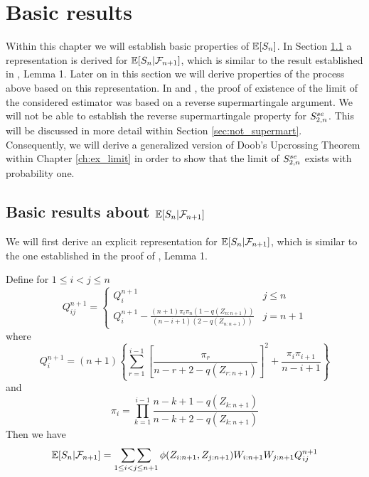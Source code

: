 \chapter{Basic results}

Within this chapter we will establish basic properties of $\mathbb{E}[S_n]$. In Section \ref{sec:representation} a representation is derived for $\mathbb{E}[S_n|\mathcal{F}_{n+1}]$, which is similar to the result established in \cite{bose1999strong}, Lemma 1. Later on in this section we will derive properties of the process above based on this representation. In \cite{bose1999strong} and \cite{dikta1998semiparametric}, the proof of existence of the limit of the considered estimator was based on a reverse supermartingale argument. We will not be able to establish the reverse supermartingale property for $S_{2,n}^{se}$. This will be discussed in more detail within Section \ref{sec:not_supermart}. Consequently, we will derive a generalized version of Doob's Upcrossing Theorem within Chapter \ref{ch:ex_limit} in order to show that the limit of $S_{2,n}^{se}$ exists with probability one.
%
%
%
\section{Basic results about $\mathbb{E}[S_{n}|\mathcal{F}_{n+1}]$} \label{sec:representation}
%
We will first derive an explicit representation for $\mathbb{E}[S_{n}|\mathcal{F}_{n+1}]$, which is similar to the one established in the proof of \cite{bose1999strong}, Lemma 1.
\begin{lemma} \label{lem:qi}
Define for $1\leq i<j\leq n$
\[Q_{ij}^{n+1} = \begin{cases} 
      Q_i^{n+1} & j\leq n \\
      Q_i^{n+1} - \frac{(n+1)\pi_i \pi_n (1-q(Z_{n:n+1}))}{(n-i+1)(2-q(Z_{n:n+1}))} & j=n+1
   \end{cases}
\]
%
where
\begin{equation}
	Q_i^{n+1} = (n+1) \left\{ \sum\limits_{r=1}^{i-1} \left[ \frac{\pi_r}{n-r+2-q(Z_{r:n+1})} \right]^2 + \frac{\pi_i\pi_{i+1}}{n-i+1} \right\}
	\label{eq:qi}
\end{equation}
and 
$$\pi_i = \prod\limits_{k=1}^{i-1} \frac{n-k+1-q(Z_{k:n+1})}{n-k+2-q(Z_{k:n+1})}$$
Then we have
$$\mathbb{E}[S_{n}|\mathcal{F}_{n+1}] = \mathop{\sum\sum}\limits_{1\leq i<j \leq n+1} \phi(Z_{i:n+1},Z_{j:n+1}) W_{i:n+1}W_{j:n+1}Q_{ij}^{n+1}$$
\end{lemma}

